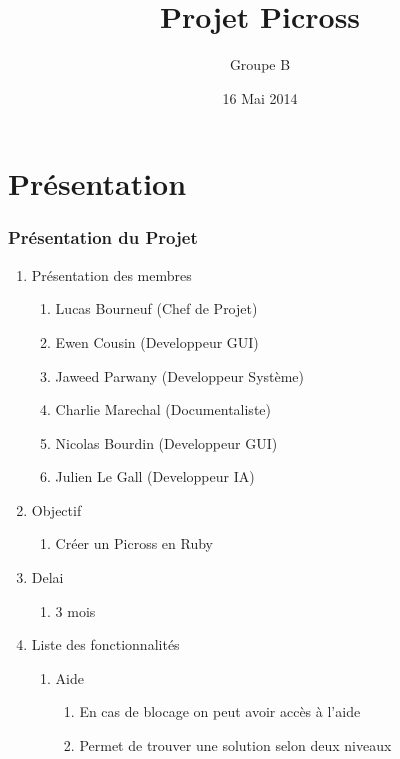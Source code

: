\documentclass[12pt]{beamer}
\title {Projet Picross}
\author{Groupe B}
\date{16 Mai 2014}
\institute{Universit√© du Maine}
\begin{document}
\maketitle
\begin{frame}{}
  \tableofcontents
\end{frame}
   
\section{Présentation}
\begin{frame}
\frametitle{Présentation du Projet}
    \begin{enumerate}
     
      \item Présentation des membres
        \begin{enumerate}
        \item Lucas Bourneuf   (Chef de Projet)
        \item Ewen Cousin      (Developpeur GUI)
        \item Jaweed Parwany   (Developpeur Système)
        \item Charlie Marechal (Documentaliste)
        \item Nicolas Bourdin  (Developpeur GUI)
        \item Julien Le Gall    (Developpeur IA)
        \end{enumerate}\pause
     
      \item Objectif
        \begin{enumerate}
            \item Créer un Picross en Ruby
        \end{enumerate}\pause
     
      \item Delai
        \begin{enumerate}
            \item 3 mois
        \end{enumerate}\pause
    
   \item Liste des fonctionnalités
    
    \begin{enumerate}
                        
        \item Aide
        \begin{enumerate}
            \item En cas de blocage on peut avoir accès à l'aide 
            \item Permet de trouver une solution selon deux niveaux
        \end{enumerate}\pause
                        

\end{enumerate}
\end{enumerate}
\end{frame}
\end{document}
